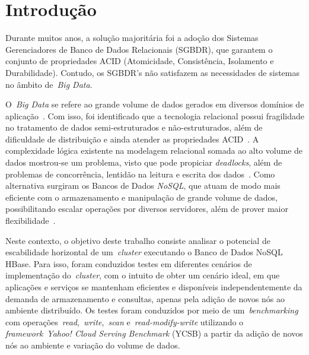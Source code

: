 \documentclass[12pt]{article}
\begin{document}
\section{Introdução}
\label{sec:introducao}
 
Durante muitos anos, a solução majoritária foi a adoção dos Sistemas Gerenciadores de Banco de Dados Relacionais (SGBDR), que garantem o conjunto de propriedades ACID (Atomicidade, Consistência, Isolamento e Durabilidade). Contudo, os SGBDR’s não satisfazem as necessidades de sistemas no âmbito de~\emph{Big Data}.%
 
O~\textit{Big Data} se refere ao grande volume de dados gerados em diversos domínios de aplicação~\cite{han2011survey}. 
Com isso, foi identificado que a tecnologia relacional possui fragilidade no tratamento de dados semi-estruturados e não-estruturados, além de dificuldade de distribuição e ainda atender as propriedades ACID~\cite{aparicio:2016}. 
A complexidade lógica existente na modelagem relacional somada ao alto volume de dados mostrou-se um problema, visto que pode propiciar \textit{deadlocks}, além de problemas de concorrência, lentidão na leitura e escrita dos dados~\cite{han2011survey}. 
Como alternativa surgiram os Bancos de Dados \textit{NoSQL}, que atuam de modo mais eficiente com o armazenamento e manipulação de grande volume de dados, possibilitando escalar operações por diversos servidores, além de prover maior flexibilidade~\cite{ramesh:2016}.

Neste contexto, o objetivo deste trabalho consiste analisar o potencial de escabilidade horizontal de um~\emph{cluster} executando o Banco de Dados NoSQL HBase. 
Para isso, foram conduzidos testes em diferentes cenários de implementação do~\emph{cluster}, com o intuito de obter um cenário ideal, em que aplicações e serviços se mantenham eficientes e disponíveis independentemente da demanda de armazenamento e consultas, apenas pela adição de novos nós ao ambiente distribuído. 
Os testes foram conduzidos por meio de um~\emph{benchmarking} com operações~\emph{read},~\emph{write},~\emph{scan} e~\emph{read-modify-write} utilizando o \textit{framework}~\emph{Yahoo! Cloud Serving Benchmark} (YCSB) a partir da adição de novos nós ao ambiente e variação do volume de dados.

\end{document}
